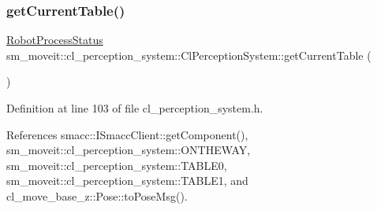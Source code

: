 \mbox{\label{classsm__moveit_1_1cl__perception__system_1_1ClPerceptionSystem_a2eb71e292ac7aca0c71dc71d84f38bea}} 
\subsubsection{\texorpdfstring{get\+Current\+Table()}{getCurrentTable()}}
{\footnotesize\ttfamily \hyperlink{namespacesm__moveit_1_1cl__perception__system_a730c3fd4da64d10a75ca4ab014fdbe40}{Robot\+Process\+Status} sm\+\_\+moveit\+::cl\+\_\+perception\+\_\+system\+::\+Cl\+Perception\+System\+::get\+Current\+Table (\begin{DoxyParamCaption}{ }\end{DoxyParamCaption})\hspace{0.3cm}{\ttfamily [inline]}}



Definition at line 103 of file cl\+\_\+perception\+\_\+system.\+h.



References smacc\+::\+I\+Smacc\+Client\+::get\+Component(), sm\+\_\+moveit\+::cl\+\_\+perception\+\_\+system\+::\+O\+N\+T\+H\+E\+W\+AY, sm\+\_\+moveit\+::cl\+\_\+perception\+\_\+system\+::\+T\+A\+B\+L\+E0, sm\+\_\+moveit\+::cl\+\_\+perception\+\_\+system\+::\+T\+A\+B\+L\+E1, and cl\+\_\+move\+\_\+base\+\_\+z\+::\+Pose\+::to\+Pose\+Msg().


